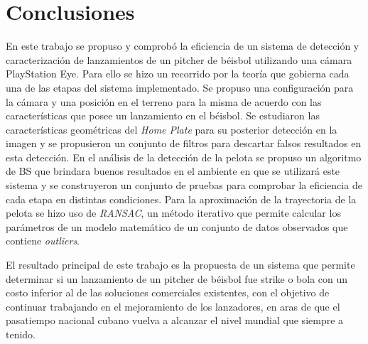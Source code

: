 \chapter*{Conclusiones}\label{chapter:conclusions}

En este trabajo se propuso y comprobó la eficiencia de un sistema de detección y caracterización de lanzamientos de un pitcher de béisbol utilizando una cámara PlayStation Eye. Para ello se hizo un recorrido por la teoría que gobierna cada una de las etapas del sistema implementado. Se propuso una configuración para la cámara y una posición en el terreno para la misma de acuerdo con las características que posee un lanzamiento en el béisbol. Se estudiaron las características geométricas del \textit{Home Plate} para su posterior detección en la imagen y se propusieron un conjunto de filtros para descartar falsos resultados en esta detección. En el análisis de la detección de la pelota se propuso un algoritmo de BS que brindara buenos resultados en el ambiente en que se utilizará este sistema y se construyeron un conjunto de pruebas para comprobar la eficiencia de cada etapa en distintas condiciones. Para la aproximación de la trayectoria de la pelota se hizo uso de \textit{RANSAC}, un método iterativo que permite calcular los parámetros de un modelo matemático de un conjunto de datos observados que contiene \textit{outliers}.


El resultado principal de este trabajo es la propuesta de un sistema que permite determinar si un lanzamiento de un pitcher de béisbol fue strike o bola con un costo inferior al de las soluciones comerciales existentes, con el objetivo de continuar trabajando en el mejoramiento de los lanzadores, en aras de que el pasatiempo nacional cubano vuelva a alcanzar el nivel mundial que siempre a tenido.


